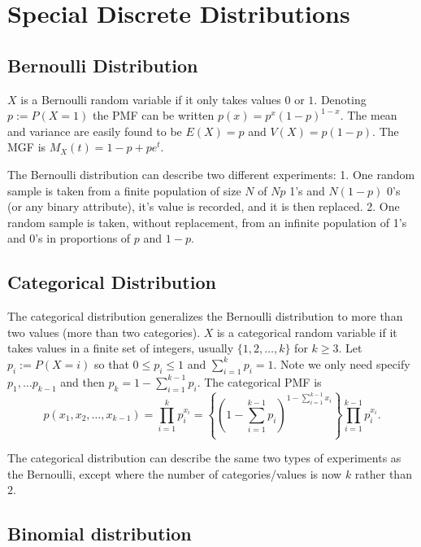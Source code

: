 \documentclass[
]{book}
\begin{document}
\hypertarget{special-discrete-distributions}{%
\chapter{Special Discrete Distributions}\label{special-discrete-distributions}}

\hypertarget{bernoulli-distribution}{%
\section{Bernoulli Distribution}\label{bernoulli-distribution}}

\(X\) is a Bernoulli random variable if it only takes values \(0\) or \(1\). Denoting \(p:=P(X=1)\) the PMF can be written \(p(x) = p^x(1-p)^{1-x}\). The mean and variance are easily found to be \(E(X) = p\) and \(V(X) = p(1-p)\). The MGF is \(M_X(t) = 1-p+pe^t\).

The Bernoulli distribution can describe two different experiments:
1. One random sample is taken from a finite population of size \(N\) of \(Np\) 1's and \(N(1-p)\) 0's (or any binary attribute), it's value is recorded, and it is then replaced.
2. One random sample is taken, without replacement, from an infinite population of 1's and 0's in proportions of \(p\) and \(1-p\).

\hypertarget{categorical-distribution}{%
\section{Categorical Distribution}\label{categorical-distribution}}

The categorical distribution generalizes the Bernoulli distribution to more than two values (more than two categories). \(X\) is a categorical random variable if it takes values in a finite set of integers, usually \(\{1,2,\ldots,k\}\) for \(k\geq 3\). Let \(p_i:=P(X=i)\) so that \(0\leq p_i\leq 1\) and \(\sum_{i=1}^k p_i = 1\). Note we only need specify \(p_1,\ldots p_{k-1}\) and then \(p_k = 1- \sum_{i=1}^{k-1}p_i\). The categorical PMF is
\[p(x_1,x_2,\ldots,x_{k-1}) = \prod_{i=1}^{k} p_i^{x_i} = \left\{(1-\sum_{i=1}^{k-1} p_i)^{1-\sum_{i=1}^{k-1} x_i}\right\} \prod_{i=1}^{k-1} p_i^{x_i}.\]

The categorical distribution can describe the same two types of experiments as the Bernoulli, except where the number of categories/values is now \(k\) rather than \(2\).

\hypertarget{binomial-distribution}{%
\section{Binomial distribution}\label{binomial-distribution}}
\end{document}
